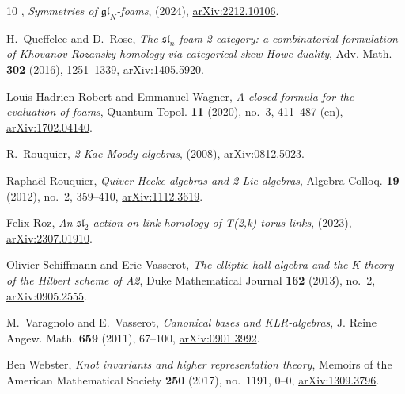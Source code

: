 \documentclass{amsart}
\numberwithin{equation}{section}
\theoremstyle{definition}
\begin{document}
\begin{thebibliography}{10}
\bysame, \emph{Symmetries of {$\mathfrak{gl}_N$}-foams},  (2024), \href{https://arxiv.org/abs/2212.10106}{arXiv:2212.10106}.

H.~Queffelec and D.~Rose, \emph{The {$\mathfrak{sl}_n$} foam 2-category: a combinatorial formulation of {K}hovanov-{R}ozansky homology via categorical skew {H}owe duality}, Adv. Math. \textbf{302} (2016), 1251--1339, \href{http://arxiv.org/abs/arXiv:1405.5920}{arXiv:1405.5920}.

Louis-Hadrien Robert and Emmanuel Wagner, \emph{A closed formula for the evaluation of foams}, Quantum Topol. \textbf{11} (2020), no.~3, 411--487 (en), \href{https://arxiv.org/abs/1702.04140}{arXiv:1702.04140}.

R.~Rouquier, \emph{2-{K}ac-{M}oody algebras},  (2008),  \href{https://arxiv.org/abs/0812.5023}{arXiv:0812.5023}.

Rapha{\"e}l Rouquier, \emph{Quiver {H}ecke algebras and 2-{L}ie algebras}, Algebra Colloq. \textbf{19} (2012), no.~2, 359--410, \href{https://arxiv.org/abs/1112.3619}{arXiv:1112.3619}.

Felix Roz, \emph{An $\mathfrak{sl}_2$ action on link homology of {T(2,k)} torus links},  (2023), \href{https://arxiv.org/abs/2307.01910}{arXiv:2307.01910}.

Olivier Schiffmann and Eric Vasserot, \emph{The elliptic hall algebra and the {K}-theory of the {H}ilbert scheme of {A2}}, Duke Mathematical Journal \textbf{162} (2013), no.~2, \href{https://arxiv.org/abs/0905.2555}{arXiv:0905.2555}.

M.~Varagnolo and E.~Vasserot, \emph{Canonical bases and {KLR}-algebras}, J. Reine Angew. Math. \textbf{659} (2011), 67--100, \href{https://arxiv.org/abs/0901.3992}{arXiv:0901.3992}.

Ben Webster, \emph{Knot invariants and higher representation theory}, Memoirs of the American Mathematical Society \textbf{250} (2017), no.~1191, 0–0, \href{https://arxiv.org/abs/1309.3796}{arXiv:1309.3796}.

\end{thebibliography}
\end{document}
